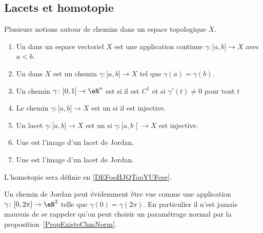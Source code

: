 \subsection{Lacets et homotopie}

\begin{definition}       \label{DEFooQZMSooYYkGDv}
	Plusieurs notions autour de chemins dans un espace topologique \( X\).
	\begin{enumerate}
		\item
		      Un  dans un espace vectoriel \( X\) est une application continue \( \gamma\colon \mathopen[ a , b \mathclose]\to X\) avec \( a<b\).
		\item
		      Un  dans \( X\) est un chemin \( \gamma\colon \mathopen[ a , b \mathclose]\to X\) tel que \( \gamma(a)=\gamma(b)\).
		\item
		      Un chemin \( \gamma\colon \mathopen[ 0 , 1 \mathclose]\to \eR^n\) est  si il est \( C^1\) et si \( \gamma'(t)\neq 0\) pour tout \( t\)
		\item
		      Le chemin \( \gamma\colon \mathopen[ a , b \mathclose]\to X\) est un  si il est injective.
		\item
		      Un lacet \( \gamma\colon \mathopen[ a , b \mathclose]\to X\) est un  si \( \gamma\colon \mathopen[ a , b \mathclose[\to X\) est injective.
		\item
		      Une  est l'image d'un lacet de Jordan.
		\item
		      Une  est l'image d'un lacet de Jordan.
	\end{enumerate}
	L'homotopie sera définie en \ref{DEFooHJQTooYUFcee}.
\end{definition}


\begin{normaltext}
	Un chemin de Jordan peut évidemment être vue comme une application \( \gamma\colon \mathopen[ 0 , 2\pi ]\to \eR^2\) telle que \( \gamma(0)=\gamma(2\pi)\). En particulier il n'est jamais mauvais de se rappeler qu'on peut choisir un paramétrage normal par la proposition~\ref{PropExisteChmNorm}.
\end{normaltext}

